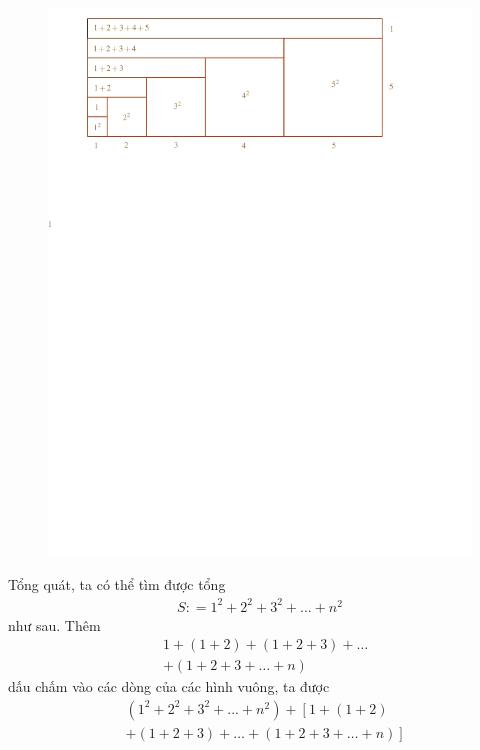 \begin{multicols}{2}
\begin{figure}[H]
		\includegraphics[width= 1\linewidth]{12.pdf}
		\vspace*{-20pt}
	\end{figure}
	Tổng quát, ta có thể tìm được tổng 
	\begin{align*}
		S: = {1^2} + {2^2} + {3^2} + ... + {n^2}
	\end{align*}
	như sau. Thêm 
	\begin{align*}
		&1 + \left( {1 + 2} \right) + \left( {1 + 2 + 3} \right) +  \ldots  \\[-0.5ex]
		&+ \left( {1 + 2 + 3 +  \ldots  + n} \right)
	\end{align*}
	dấu chấm vào các dòng của các hình vuông, ta được
	\begin{align*}
			&\left( {{1^2} + {2^2} + {3^2} + ... + {n^2}} \right)+ \left[ 1 + \left( {1 + 2} \right)\right.\\[-0.6ex]
			&\left. + \left( {1 + 2 + 3} \right) +  \ldots  + \left( {1 + 2 + 3 +  \ldots  + n} \right) \right]

\end{align*}
\end{multicols}
